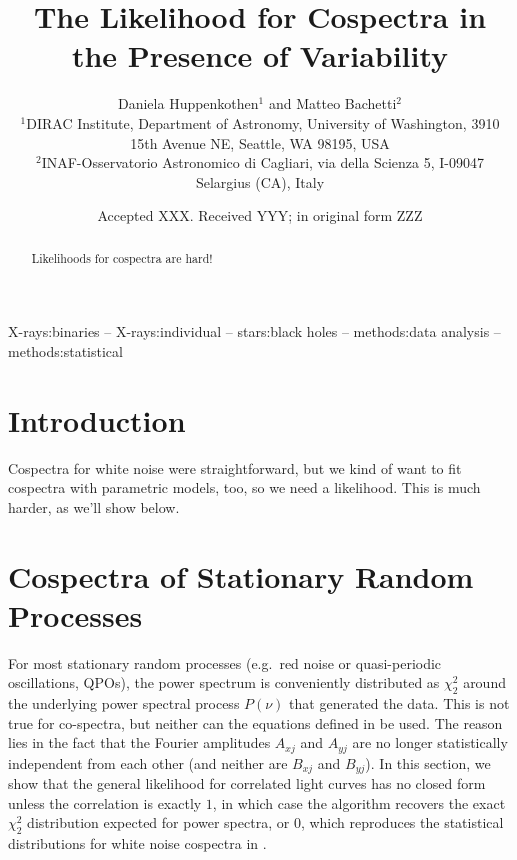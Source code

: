 \documentclass[fleqn,usenatbib]{mnras}
\title[]{The Likelihood for Cospectra in the Presence of Variability}
\author[Huppenkothen et al.]{Daniela Huppenkothen$^{1}$ and Matteo Bachetti$^{2}$
\\
   $^{1}$DIRAC Institute, Department of Astronomy, University of Washington, 3910 15th Avenue NE, Seattle, WA 98195, USA\\
   $^{2}$INAF-Osservatorio Astronomico di Cagliari, via della Scienza 5, I-09047 Selargius (CA), Italy \\
}
\date{Accepted XXX. Received YYY; in original form ZZZ}
\begin{document}
\label{firstpage}
\pagerange{\pageref{firstpage}--\pageref{lastpage}}
\maketitle

\begin{abstract}
Likelihoods for cospectra are hard!
\end{abstract}

\begin{keywords}
X-rays:binaries -- X-rays:individual -- stars:black holes -- methods:data analysis -- methods:statistical
\end{keywords}

\section{Introduction}

Cospectra for white noise were straightforward, but we kind of want to fit cospectra with parametric models, too, so we need a likelihood. This is much harder, as we'll show below.

\section{Cospectra of Stationary Random Processes}

For most stationary random processes (e.g.\ red noise or quasi-periodic oscillations, QPOs), the power spectrum is conveniently distributed as $\chi^2_2$ around the underlying power spectral process $P(\nu)$ that generated the data. This is not true for co-spectra, but neither can the equations defined in \citet{huppenkothen2018} be used. The reason lies in the fact that the Fourier amplitudes $A_{xj}$ and $A_{yj}$ are no longer statistically independent from each other (and neither are $B_{xj}$ and $B_{yj}$). In this section, we show that the general likelihood for correlated light curves has no closed form unless the correlation is exactly $1$, in which case the algorithm recovers the exact $\chi^2_2$ distribution expected for power spectra, or $0$, which reproduces the statistical distributions for white noise cospectra in \citet{huppenkothen2018}. %
\end{document}
